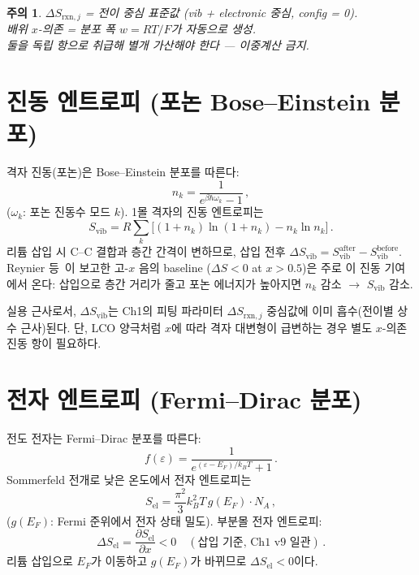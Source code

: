 \documentclass[11pt,a4paper]{article}
\newtheorem*{warnbox}{주의}
\newcommand{\rxn}{\mathrm{rxn}}
\newcommand{\vib}{\mathrm{vib}}
\newcommand{\el}{\mathrm{el}}
\begin{document}
\begin{warnbox}
$\Delta S_{\rxn,j}$ = 전이 중심 표준값 (vib + electronic 중심, config = 0).\\
배위 $x$-의존 = 분포 폭 $w=RT/F$가 자동으로 생성.\\
둘을 \emph{독립 항}으로 취급해 별개 가산해야 한다 --- 이중계산 금지.
\end{warnbox}

\section{진동 엔트로피 (포논 Bose--Einstein 분포)}\label{sec:vib}

격자 진동(포논)은 Bose--Einstein 분포를 따른다:
\begin{equation}
  n_k=\frac{1}{e^{\beta\hbar\omega_k}-1}\,,
  \label{eq:BE}
\end{equation}
($\omega_k$: 포논 진동수 모드 $k$). 1몰 격자의 진동 엔트로피는
\begin{equation}
  S_\vib = R\sum_k\bigl[(1+n_k)\ln(1+n_k)-n_k\ln n_k\bigr]\,.
  \label{eq:Svib}
\end{equation}
리튬 삽입 시 C--C 결합과 층간 간격이 변하므로,
삽입 전후 $\Delta S_\vib=S_\vib^\mathrm{after}-S_\vib^\mathrm{before}$.
Reynier 등~\cite{reynier2003}이 보고한 고-$x$ 음의 baseline
($\Delta S<0$ at $x>0.5$)은 주로 이 진동 기여에서 온다:
삽입으로 층간 거리가 줄고 포논 에너지가 높아지면 $n_k$ 감소 $\to$ $S_\vib$ 감소.

실용 근사로서, $\Delta S_\vib$는 Ch1의 피팅 파라미터 $\Delta S_{\rxn,j}$ 중심값에
이미 흡수(전이별 상수 근사)된다. 단, LCO 양극처럼 $x$에 따라 격자 대변형이 급변하는 경우
별도 $x$-의존 진동 항이 필요하다.

\section{전자 엔트로피 (Fermi--Dirac 분포)}\label{sec:electronic}

전도 전자는 Fermi--Dirac 분포를 따른다:
\begin{equation}
  f(\varepsilon)=\frac{1}{e^{(\varepsilon-E_F)/k_BT}+1}\,.
  \label{eq:FD_el}
\end{equation}
Sommerfeld 전개로 낮은 온도에서 전자 엔트로피는
\begin{equation}
  S_\el = \frac{\pi^2}{3}k_B^2 T\,g(E_F)\cdot N_A\,,
  \label{eq:Sel_sommerfeld}
\end{equation}
($g(E_F)$: Fermi 준위에서 전자 상태 밀도).
부분몰 전자 엔트로피:
\begin{equation}
  \Delta S_\el = \frac{\partial S_\el}{\partial x}<0
  \quad(\text{삽입 기준, Ch1 v9 일관})\,.
  \label{eq:dSel}
\end{equation}
리튬 삽입으로 $E_F$가 이동하고 $g(E_F)$가 바뀌므로 $\Delta S_\el<0$이다.
\end{document}
